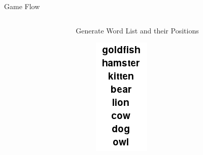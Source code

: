 \documentclass{beamer}
\begin{document}
\begin{frame}{Game Flow}
\begin{columns}[c]
\begin{column}[b]{3cm}
\end{column}
\pause
\begin{column}{3cm}
\begin{tcolorbox}[colback=blue!5,colframe=blue!50!black, title=3]
\centering Generate Word List and their Positions
\end{tcolorbox}
\pause
\begin{figure}
\includegraphics[scale=0.4]{word_list1.png}
\end{figure}
\end{column}

\end{columns}
\end{frame}
\end{document}
